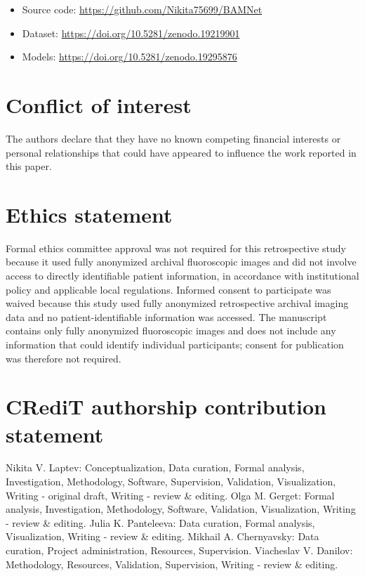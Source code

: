\documentclass[preprint,12pt,authoryear]{elsarticle}
\begin{document}
\begin{itemize}
\item Source code: \url{https://github.com/Nikita75699/BAMNet}
\item Dataset: \url{https://doi.org/10.5281/zenodo.19219901}
\item Models: \url{https://doi.org/10.5281/zenodo.19295876}
\end{itemize}

\section*{Conflict of interest}

The authors declare that they have no known competing financial interests or personal relationships that could have appeared to influence the work reported in this paper.

\section*{Ethics statement}

Formal ethics committee approval was not required for this retrospective study because it used fully anonymized archival fluoroscopic images and did not involve access to directly identifiable patient information, in accordance with institutional policy and applicable local regulations. Informed consent to participate was waived because this study used fully anonymized retrospective archival imaging data and no patient-identifiable information was accessed. The manuscript contains only fully anonymized fluoroscopic images and does not include any information that could identify individual participants; consent for publication was therefore not required.

\section*{CRediT authorship contribution statement}

Nikita V. Laptev: Conceptualization, Data curation, Formal analysis, Investigation, Methodology, Software, Supervision, Validation, Visualization, Writing - original draft, Writing - review \& editing. Olga M. Gerget: Formal analysis, Investigation, Methodology, Software, Validation, Visualization, Writing - review \& editing. Julia K. Panteleeva: Data curation, Formal analysis, Visualization, Writing - review \& editing. Mikhail A. Chernyavsky: Data curation, Project administration, Resources, Supervision. Viacheslav V. Danilov: Methodology, Resources, Validation, Supervision, Writing - review \& editing.
\end{document}
